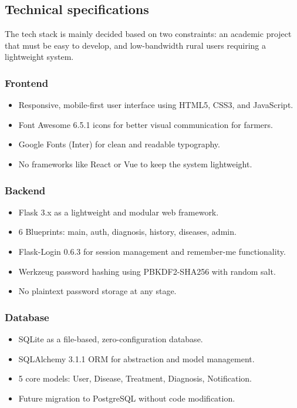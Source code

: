 \documentclass[12pt,a4paper]{article}
\begin{document}
\subsection{Technical specifications}
\label{sec:techspec}

The tech stack is mainly decided based on two constraints: an academic project that must be easy to develop, and low-bandwidth rural users requiring a lightweight system.

\subsubsection*{Frontend}

\begin{itemize}[leftmargin=2em]
  \item Responsive, mobile-first user interface using HTML5, CSS3, and JavaScript.
  \item Font Awesome 6.5.1 icons for better visual communication for farmers.
  \item Google Fonts (Inter) for clean and readable typography.
  \item No frameworks like React or Vue to keep the system lightweight.
\end{itemize}

\subsubsection*{Backend}

\begin{itemize}[leftmargin=2em]
  \item Flask 3.x as a lightweight and modular web framework.
  \item 6 Blueprints: main, auth, diagnosis, history, diseases, admin.
  \item Flask-Login 0.6.3 for session management and remember-me functionality.
  \item Werkzeug password hashing using PBKDF2-SHA256 with random salt.
  \item No plaintext password storage at any stage.
\end{itemize}

\subsubsection*{Database}

\begin{itemize}[leftmargin=2em]
  \item SQLite as a file-based, zero-configuration database.
  \item SQLAlchemy 3.1.1 ORM for abstraction and model management.
  \item 5 core models: User, Disease, Treatment, Diagnosis, Notification.
  \item Future migration to PostgreSQL without code modification.
\end{itemize}
\end{document}
